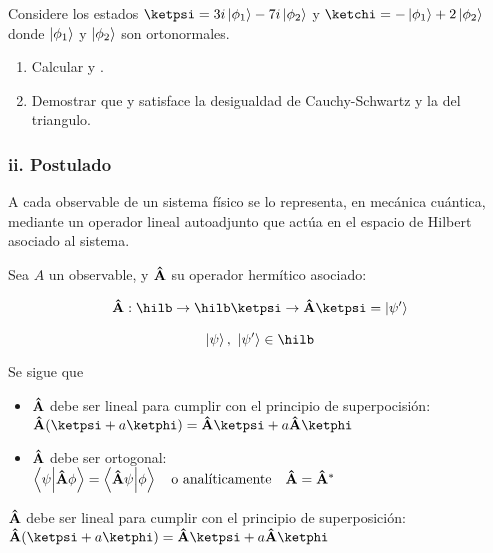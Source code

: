 \begin{example}[Operadores]
    Considere los estados $\ketpsi=3i\ket{\phi_1}-7i\ket{\phi_2}$ y $\ketchi=-\ket{\phi_1}+2\ket{\phi_2}$ donde $\ket{\phi_1}$ y $\ket{\phi_2}$ son ortonormales.
    \begin{enumerate}
        \item Calcular \braketac y \braketca.
        \item Demostrar que \ketpsi y \ketchi satisface la desigualdad de Cauchy-Schwartz y la del triangulo.
    \end{enumerate}
    
\end{example}

\subsubsection{ii. Postulado}

A cada observable de un sistema físico se lo representa, en mecánica cuántica, mediante un operador lineal autoadjunto que actúa en el espacio de Hilbert \hilb asociado al sistema.

Sea $A$ un observable, y $\vu{A}$ su operador hermítico asociado:

\begin{align*}
    \vu{A}:\hilb\then\hilb
    \ketpsi\then\vu{A}\ketpsi=\ket{\psi'}
\end{align*}

$$
    \ket{\psi},~\ket{\psi'}\in\hilb
$$

Se sigue que

\begin{itemize}
    \item $\vu{A}$ debe ser lineal para cumplir con el principio de superpocisión:\\
    $\vu{A}(\ketpsi+a\ketphi)=\vu{A}\ketpsi+a\vu{A}\ketphi$
    \item $\vu{A}$ debe ser ortogonal:\\
    $ \braket{\psi}{\vu{A}\phi}=\braket{\vu{A}\psi}{\phi}\qq{o analíticamente}\vu{A}=\vu{A}^*$
\end{itemize}

$\vu{A}$ debe ser lineal para cumplir con el principio de superposición:\\
    $\vu{A}(\ketpsi+a\ketphi)=\vu{A}\ketpsi+a\vu{A}\ketphi$
    
